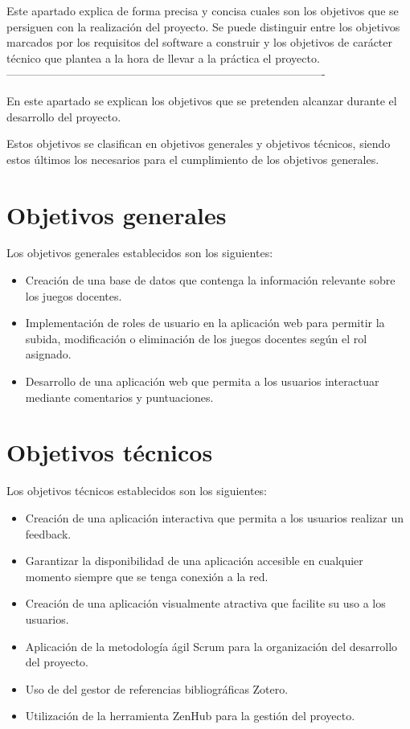 
Este apartado explica de forma precisa y concisa cuales son los objetivos que se persiguen con la realización del proyecto. Se puede distinguir entre los objetivos marcados por los requisitos del software a construir y los objetivos de carácter técnico que plantea a la hora de llevar a la práctica el proyecto.
-------------------------------------------------------------------------------------

En este apartado se explican los objetivos que se pretenden alcanzar durante el desarrollo del proyecto.

Estos objetivos se clasifican en objetivos generales y objetivos técnicos, siendo estos últimos los necesarios para el cumplimiento de los objetivos generales.

\section {Objetivos generales}
Los objetivos generales establecidos son los siguientes:
\begin{itemize}
    \item Creación de una base de datos que contenga la información relevante sobre los juegos docentes.
    \item Implementación de roles de usuario en la aplicación web para permitir la subida, modificación o eliminación de los juegos docentes según el rol asignado.
    \item Desarrollo de una aplicación web que permita a los usuarios interactuar mediante comentarios y puntuaciones.
\end{itemize}

\section {Objetivos técnicos}
Los objetivos técnicos establecidos son los siguientes:
\begin{itemize}
    \item Creación de una aplicación interactiva que permita a los usuarios realizar un feedback.
    \item Garantizar la disponibilidad de una aplicación accesible en cualquier momento siempre que se tenga conexión a la red.
    \item Creación de una aplicación visualmente atractiva que facilite su uso a los usuarios.
    \item Aplicación de la metodología ágil Scrum para la organización del desarrollo del proyecto.
    \item Uso de del gestor de referencias bibliográficas Zotero.
    \item Utilización de la herramienta ZenHub para la gestión del proyecto.
\end{itemize}
	

